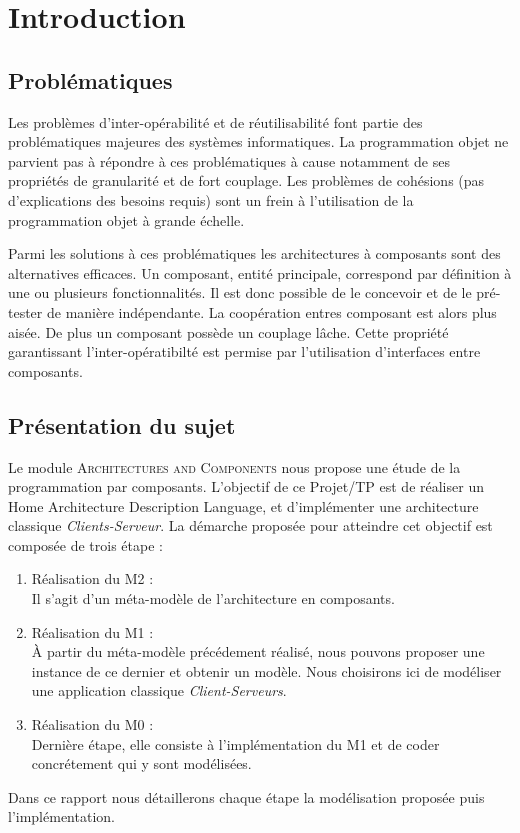 \chapter{Introduction}\label{chap:Intro}

\section{Problématiques}
Les problèmes d'inter-opérabilité et de réutilisabilité font partie des problématiques majeures des systèmes informatiques. La programmation objet ne parvient pas à répondre à ces problématiques à cause notamment de ses propriétés de granularité et de fort couplage. Les problèmes de cohésions (pas d'explications des besoins requis) sont un frein à l'utilisation de la programmation objet à grande échelle. 

Parmi les solutions à ces problématiques les architectures à composants sont des alternatives efficaces. Un composant, entité principale, correspond par définition à une ou plusieurs fonctionnalités. Il est donc possible de le concevoir et de le pré-tester de manière indépendante. La coopération entres composant est alors plus aisée. De plus un composant possède un couplage lâche. Cette propriété garantissant l'inter-opératibilté est permise par l'utilisation d'interfaces entre composants. 

\section{Présentation du sujet}
Le module \textsc{Architectures and Components} nous propose une étude de la programmation par composants. L'objectif de ce Projet/TP  est de réaliser un Home Architecture Description Language, et d'implémenter une architecture classique \emph{Clients-Serveur}. La démarche proposée pour atteindre cet objectif est composée de trois étape : 


\begin{enumerate}
\item 
Réalisation du M2 :\hfill \\
Il s'agit d'un méta-modèle de l'architecture en composants.  
\item
Réalisation du M1 :\hfill \\
À partir du méta-modèle précédement réalisé, nous pouvons proposer une instance de ce dernier et obtenir un modèle. Nous choisirons ici de modéliser une application classique \emph{Client-Serveurs}.  
\item
Réalisation du M0 :\hfill \\
Dernière étape, elle consiste à l'implémentation du M1 et de coder concrétement qui y sont modélisées.
\end{enumerate}

Dans ce rapport nous détaillerons chaque étape la modélisation proposée puis l'implémentation.
